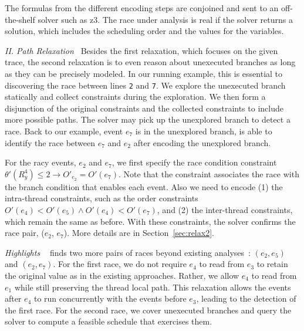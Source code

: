 The formulas from the different encoding steps are conjoined and sent to an 
off-the-shelf solver such as {\sf z3}.  The race under analysis is real 
if the solver returns a solution, which includes the scheduling order 
and the values for the variables. 


\smallskip
\noindent
{\em II. Path Relaxation\ } 
Besides the first relaxation, which focuses on the given trace, the second
relaxation is to even reason about unexecuted branches as long as they
can be precisely modeled. In our 
running example, this is essential to discovering the race between 
lines {\tt 2} and {\tt 7}. We explore the unexecuted branch statically 
and collect constraints during the exploration. We then form a disjunction  
of the original constraints and the collected constraints to include more 
possible  paths. The solver may pick up the unexplored branch to detect 
a race. Back to our example, event $e_7$ is in the unexplored branch, \tool
is able to identify the race between $e_7$ and $e_2$ after encoding 
the unexplored branch. 

For the racy events, $e_2$ and $e_7$, we first specify the race condition 
constraint  $\theta'(R^4_y)\leq 2\rightarrow O'_{e_2}=O'(e_7)$. Note that 
the constraint associates the race with the branch condition that 
enables each event.  Also we need to encode (1) the intra-thread constraints, 
such as the  order constraints $O'(e_4)<O'(e_5)\wedge O'(e_4)<O'(e_7)$, 
and (2) the inter-thread constraints, which remain the same as before. 
With these constraints, the solver confirms the race pair, ($e_2$, $e_7$). 
More details are in Section~\ref{sec:relax2}.



\smallskip
\noindent
{\em Highlights \ } \tool finds two more pairs of races 
beyond existing analyses~\cite{yannis, jeff}: $(e_2, e_5)$ and $(e_2, e_7)$.
For the first race, we do not require $e_4$ to read from $e_3$ to 
retain the original value as in the
existing approaches. Rather, we allow $e_4$ to read from $e_1$ while 
still preserving the thread local path. This relaxation allows 
the events after $e_4$ to run concurrently with the events before 
$e_3$, leading to the detection of the first race.  For the second race, 
we cover unexecuted branches and query the solver to compute a feasible 
schedule that exercises them. 

 
